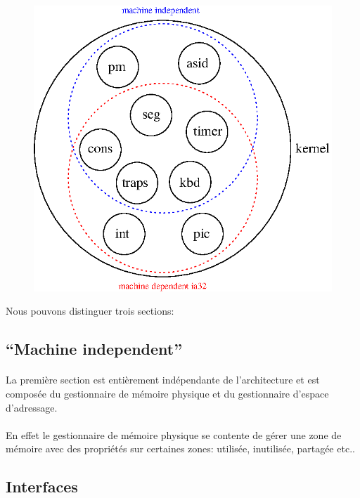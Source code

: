 \documentclass[10pt,a4wide]{article}
\begin{document}
\begin{figure}[h]
\centerline{\includegraphics{figures/visualisation.eps}}
\end{figure}

Nous pouvons distinguer trois sections:

\subsection{``Machine independent''}

\paragraph{}

La premi\`ere section est enti\`erement ind\'ependante de l'architecture et
est compos\'ee du gestionnaire de m\'emoire physique et du gestionnaire
d'espace d'adressage.

\paragraph{}

En effet le gestionnaire de m\'emoire physique se contente de g\'erer
une zone de m\'emoire avec des propri\'et\'es sur certaines zones: utilis\'ee,
inutilis\'ee, partag\'ee etc..

\subsection{Interfaces}
\end{document}
